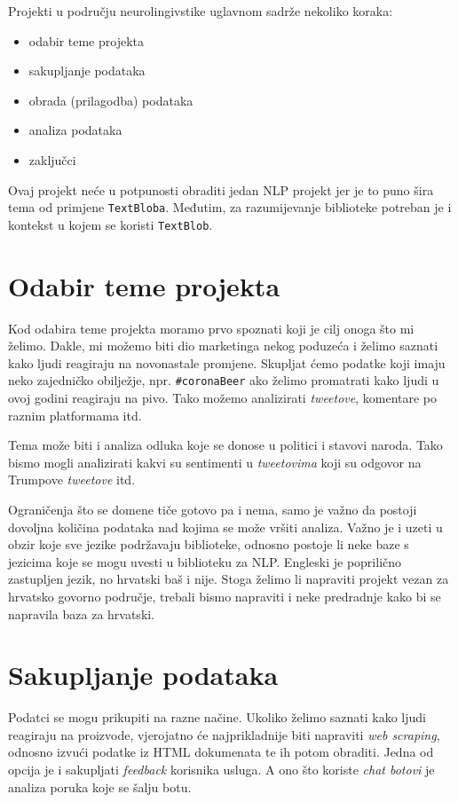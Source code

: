 \documentclass[10pt]{foi}
\begin{document}
Projekti u području neurolingivstike uglavnom sadrže nekoliko koraka:
\begin{itemize}
	\item odabir teme projekta
	\item sakupljanje podataka
	\item obrada (prilagodba) podataka
	\item analiza podataka
	\item zaključci
\end{itemize}

Ovaj projekt neće u potpunosti obraditi jedan NLP projekt jer je to puno šira
tema od primjene \texttt{TextBloba}. Međutim, za razumijevanje biblioteke
potreban je i kontekst u kojem se koristi \texttt{TextBlob}.

\section{Odabir teme projekta}

Kod odabira teme projekta moramo prvo spoznati koji je cilj onoga što mi
želimo. Dakle, mi možemo biti dio marketinga nekog poduzeća i želimo saznati
kako ljudi reagiraju na novonastale promjene. Skupljat ćemo podatke koji imaju
neko zajedničko obilježje, npr. \texttt{\#coronaBeer} ako želimo promatrati kako
ljudi u ovoj godini reagiraju na pivo. Tako možemo analizirati
\textit{tweetove}, komentare po raznim platformama itd.

Tema može biti i analiza odluka koje se donose u politici i stavovi naroda.
Tako bismo mogli analizirati kakvi su sentimenti u \textit{tweetovima} koji su
odgovor na Trumpove \textit{tweetove} itd.

Ograničenja što se domene tiče gotovo pa i nema, samo je važno da postoji
dovoljna količina podataka nad kojima se može vršiti analiza. Važno je i uzeti
u obzir koje sve jezike podržavaju biblioteke, odnosno postoje li neke baze s
jezicima koje se mogu uvesti u biblioteku za NLP. Engleski je poprilično
zastupljen jezik, no hrvatski baš i nije. Stoga želimo li napraviti projekt
vezan za hrvatsko govorno područje, trebali bismo napraviti i neke predradnje
kako bi se napravila baza za hrvatski.

\section{Sakupljanje podataka}

Podatci se mogu prikupiti na razne načine. Ukoliko želimo saznati kako ljudi
reagiraju na proizvode, vjerojatno će najprikladnije biti napraviti
\textit{web scraping}, odnosno izvući podatke iz HTML dokumenata te ih potom
obraditi. Jedna od opcija je i sakupljati \textit{feedback} korisnika usluga. A
ono što koriste \textit{chat botovi} je analiza poruka koje se šalju botu.
\end{document}
